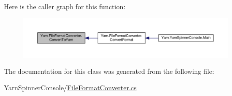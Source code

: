 Here is the caller graph for this function\-:
\nopagebreak
\begin{figure}[H]
\begin{center}
\leavevmode
\includegraphics[width=350pt]{a00102_a1e6cd39b0c813f21da278367dcff76d2_icgraph}
\end{center}
\end{figure}




The documentation for this class was generated from the following file\-:\begin{DoxyCompactItemize}
\item 
Yarn\-Spinner\-Console/\hyperlink{a00301}{File\-Format\-Converter.\-cs}\end{DoxyCompactItemize}
